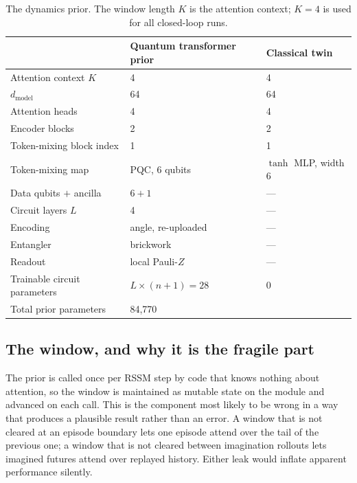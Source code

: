 \documentclass[11pt]{article}
\newif\ifdraft
\newcommand{\pend}[1]{%
  \ifdraft\textcolor{PendFG}{\textbf{[TODO:} \textit{#1}\textbf{]}}\fi}
\begin{document}
\begin{table}[h]\centering\small
\caption{The dynamics prior. The window length $K$ is the attention
context; $K = 4$ is used for all closed-loop runs.}
\label{tab:arch}
\begin{tabular}{lll}
\toprule
& Quantum transformer prior & Classical twin \\
\midrule
Attention context $K$        & 4                 & 4 \\
$d_{\text{model}}$           & 64                & 64 \\
Attention heads              & 4                 & 4 \\
Encoder blocks               & 2                 & 2 \\
Token-mixing block index     & 1                 & 1 \\
Token-mixing map             & PQC, 6 qubits     & $\tanh$ MLP, width 6 \\
Data qubits $+$ ancilla      & $6 + 1$           & --- \\
Circuit layers $L$           & 4                 & --- \\
Encoding                     & angle, re-uploaded & --- \\
Entangler                    & brickwork         & --- \\
Readout                      & local Pauli-$Z$   & --- \\
\midrule
Trainable circuit parameters & $L \times (n+1) = 28$ & 0 \\
Total prior parameters       & 84{,}770          & \pend{count} \\
\bottomrule
\end{tabular}
\end{table}

\subsection{The window, and why it is the fragile part}
The prior is called once per RSSM step by code that knows nothing about
attention, so the window is maintained as mutable state on the module
and advanced on each call. This is the component most likely to be
wrong in a way that produces a plausible result rather than an error. A
window that is not cleared at an episode boundary lets one episode
attend over the tail of the previous one; a window that is not cleared
between imagination rollouts lets imagined futures attend over replayed
history. Either leak would inflate apparent performance silently.
\end{document}
